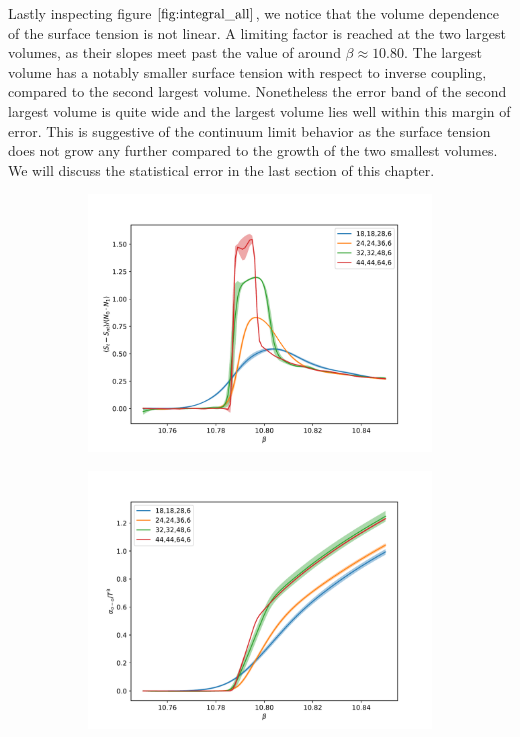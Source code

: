 \documentclass[english,twoside,openright]{UH_TCM_MSc}
\begin{document}
Lastly inspecting figure $\ref{fig:integral_all}$, we notice that the volume dependence of the surface tension is not linear. A limiting factor is reached at the two largest volumes, as their slopes meet past the value of around $\beta \approx 10.80$. The largest volume has a notably smaller surface tension with respect to inverse coupling, compared to the second largest volume. Nonetheless the error band of the second largest volume is quite wide and the largest volume lies well within this margin of error. This is suggestive of the continuum limit behavior as the surface tension does not grow any further compared to the growth of the two smallest volumes. We will discuss the statistical error in the last section of this chapter.
\begin{figure}[!htb]
    \centering
        \begin{subfigure}[t]{\textwidth}
        \centering
        \includegraphics[width=\textwidth]{final_plots/misc/difference_divide.pdf}
        \caption{}
        \label{fig:difference_all}
    \end{subfigure}
    \begin{subfigure}[t]{\textwidth}
        \centering
        \includegraphics[width=\textwidth]{final_plots/misc/integral.pdf}

\end{subfigure}
\end{figure}
\end{document}
